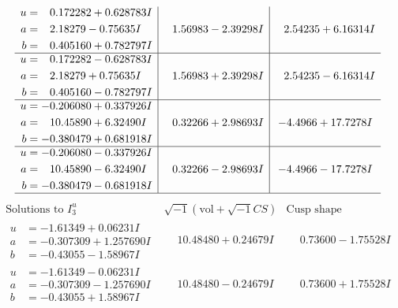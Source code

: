 \documentclass[1p]{elsarticle_modified}
\theoremstyle{definition}
\newcommand{\I}{\sqrt{-1}}
\begin{document}
$$\begin{array}{c|c|c}
\begin{aligned}
u &= \phantom{-}0.172282 + 0.628783 I \\
a &= \phantom{-}2.18279 - 0.75635 I \\
b &= \phantom{-}0.405160 + 0.782797 I\end{aligned}
 & \phantom{-}1.56983 - 2.39298 I & \phantom{-}2.54235 + 6.16314 I \\ \hline\begin{aligned}
u &= \phantom{-}0.172282 - 0.628783 I \\
a &= \phantom{-}2.18279 + 0.75635 I \\
b &= \phantom{-}0.405160 - 0.782797 I\end{aligned}
 & \phantom{-}1.56983 + 2.39298 I & \phantom{-}2.54235 - 6.16314 I \\ \hline\begin{aligned}
u &= -0.206080 + 0.337926 I \\
a &= \phantom{-}10.45890 + 6.32490 I \\
b &= -0.380479 + 0.681918 I\end{aligned}
 & \phantom{-}0.32266 + 2.98693 I & -4.4966 + 17.7278 I \\ \hline\begin{aligned}
u &= -0.206080 - 0.337926 I \\
a &= \phantom{-}10.45890 - 6.32490 I \\
b &= -0.380479 - 0.681918 I\end{aligned}
 & \phantom{-}0.32266 - 2.98693 I & -4.4966 - 17.7278 I\\
 \hline 
 \end{array}$$\newpage$$\begin{array}{c|c|c}  
\text{Solutions to }I^u_{3}& \I (\text{vol} + \sqrt{-1}CS) & \text{Cusp shape}\\
 \hline 
\begin{aligned}
u &= -1.61349 + 0.06231 I \\
a &= -0.307309 + 1.257690 I \\
b &= -0.43055 - 1.58967 I\end{aligned}
 & \phantom{-}10.48480 + 0.24679 I & \phantom{-}0.73600 - 1.75528 I \\ \hline\begin{aligned}
u &= -1.61349 - 0.06231 I \\
a &= -0.307309 - 1.257690 I \\
b &= -0.43055 + 1.58967 I\end{aligned}
 & \phantom{-}10.48480 - 0.24679 I & \phantom{-}0.73600 + 1.75528 I \\ \hline\begin{aligned}

\end{aligned}
\end{array}$$
\end{document}
